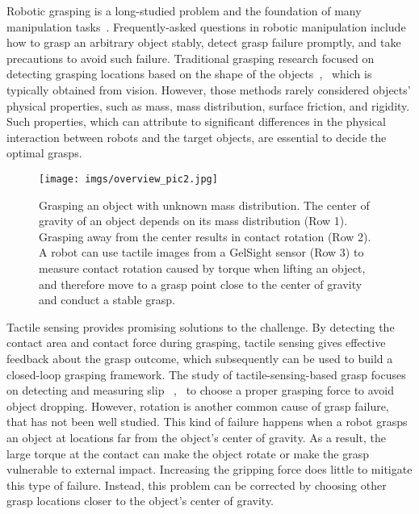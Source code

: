 Robotic grasping is a long-studied problem and the foundation of many manipulation tasks~\cite{grasp-review}. Frequently-asked questions in robotic manipulation include how to grasp an arbitrary object stably, detect grasp failure promptly, and take precautions to avoid such failure. Traditional grasping research focused on detecting grasping locations based on the shape of the objects~\cite{model_grasp_sythesis},~\cite{data-driven_grasp_sythesis} which is typically obtained from vision. However, those methods rarely considered objects' physical properties, such as mass, mass distribution, surface friction, and rigidity. Such properties, which can attribute to significant differences in the physical interaction between robots and the target objects, are essential to decide the optimal grasps. 

\begin{figure}[!htbp]
    \centering
    \texttt{[image: imgs/overview\_pic2.jpg]}
    \caption{Grasping an object with unknown mass distribution. 
    The center of gravity of an object depends on its mass distribution (Row 1). Grasping away from the center results in contact rotation (Row 2).
    A robot can use tactile images from a GelSight sensor (Row 3) to measure contact rotation caused by torque when lifting an object, and therefore move to a grasp point close to the center of gravity and conduct a stable grasp. 
    }
    \label{fig:overview}
\end{figure}

Tactile sensing provides promising solutions to the challenge. By detecting the contact area and contact force during grasping, tactile sensing gives effective feedback about the grasp outcome, which subsequently can be used to build a closed-loop grasping framework. The study of tactile-sensing-based grasp focuses on detecting and measuring slip ~\cite{robot-human-grasp},~\cite{shear-slip} to choose a proper grasping force to avoid object dropping. However, rotation is another common cause of grasp failure, that has not been well studied. This kind of failure happens when a robot grasps an object at locations far from the object's center of gravity. As a result, the large torque at the contact can make the object rotate or make the grasp vulnerable to external impact. Increasing the gripping force does little to mitigate this type of failure. Instead, this problem can be corrected by choosing other grasp locations closer to the object's center of gravity.  

